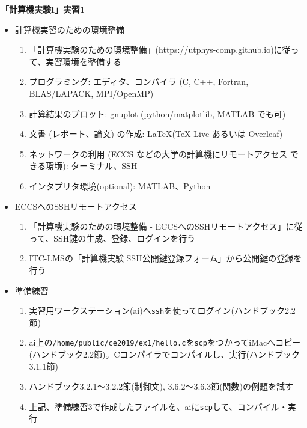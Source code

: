 \documentclass[11pt]{jarticle}
\begin{document}
\noindent
{\bf\large 「計算機実験I」実習1}
\\[-0.5em]

\noindent
\begin{itemize}
\item 計算機実習のための環境整備
  \begin{enumerate}
  \item 「計算機実験のための環境整備」(https://utphys-comp.github.io)に従って、実習環境を整備する
  \item プログラミング: エディタ、コンパイラ (C, C++, Fortran, BLAS/LAPACK, MPI/OpenMP)
  \item 計算結果のプロット: gnuplot (python/matplotlib, MATLAB でも可)
  \item 文書 (レポート、論文) の作成: \LaTeX (TeX Live あるいは Overleaf)
  \item ネットワークの利用 (ECCS などの大学の計算機にリモートアクセス できる環境): ターミナル、SSH
    \item インタプリタ環境(optional): MATLAB、Python
  \end{enumerate}
\item ECCSへのSSHリモートアクセス
  \begin{enumerate}
  \item 「計算機実験のための環境整備 - ECCSへのSSHリモートアクセス」に従って、SSH鍵の生成、登録、ログインを行う
  \item ITC-LMSの「計算機実験 SSH公開鍵登録フォーム」から公開鍵の登録を行う
  \end{enumerate}
  
  
\item 準備練習
  \begin{enumerate}
  \item 実習用ワークステーション(ai)へ{\tt ssh}を使ってログイン(ハンドブック2.2節)
  \item ai上の{\tt /home/public/ce2019/ex1/hello.c}を{\tt scp}をつかってiMacへコピー(ハンドブック2.2節)。Cコンパイラでコンパイルし、実行(ハンドブック3.1.1節)
  \item ハンドブック3.2.1〜3.2.2節(制御文), 3.6.2〜3.6.3節(関数)の例題を試す
  \item 上記、準備練習3で作成したファイルを、aiに{\tt scp}して、コンパイル・実行
  \end{enumerate}


\end{itemize}
\end{document}
